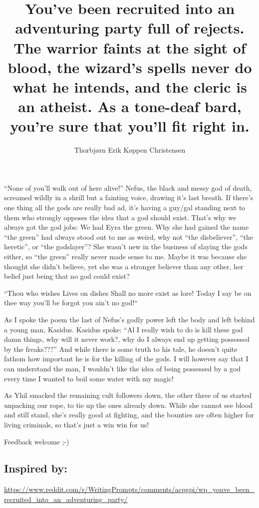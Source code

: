 \documentclass[oneside,danish,onecolumn,openbib,a4paper]{memoir}
\title{You've been recruited into an adventuring party full of rejects. The warrior faints at the sight of blood, the wizard's spells never do what he intends, and the cleric is an atheist. As a tone-deaf bard, you're sure that you'll fit right in.}
\author{Thorbjørn Erik Køppen Christensen}
\begin{document}
\maketitle{}

``None of you'll walk out of here alive!'' Nefus, the black and messy god of death, screamed wildly in a shrill but a fainting voice, drawing it's last breath.
If there's one thing all the gods are really bad ad, it's having a guy/gal standing next to them who strongly opposes the idea that a god should exist.
That's why we always got the god jobs: 
We had Eyra the green.
Why she had gained the name ``the green'' had always stood out to me as weird, why not ``the disbeliever'', ``the heretic'',  or ``the godslayer''?
She wasn't new in the business of slaying the gods either, so ``the green'' really never made sense to me.
Maybe it was because she thought she didn't believe, yet she was a stronger believer than any other, her belief just being that no god could exist?\newline\newline
\begin{centering}
       ``Thou who wishes \newline
       Lives on dishes\newline
       Shall no more\newline
       exist as lore! \newline\newline
       Today I say\newline
       be on thee way\newline
       you'll be forgot\newline
       you ain't no god!{``}\newline

\end{centering}

As I spoke the poem the last of Nefus's godly power left the body and left behind a young man, Kasidus.
Kasidus spoke: ``Al I really wish to do is kill these god damn things, why will it never work?, why do I always end up getting possessed by the freaks???''
And while there is some truth to his tale, he doesn't quite fathom how important he is for the killing of the gods. 
I will however say that I can understand the man, I wouldn't like the idea of being possessed by a god every time I wanted to boil some water with my magic!

As Yhil smacked the remaining cult followers down, the other three of us started unpacking our rope, to tie up the ones already down.
While she cannot see blood and still stand, she's really good at fighting, and the bounties are often higher for living criminals, so that's just a win win for us!


Feedback welcome ;-)
\subsection{Inspired by:}
\url{https://www.reddit.com/r/WritingPrompts/comments/acpgpi/wp_youve_been_recruited_into_an_adventuring_party/}
\end{document}
